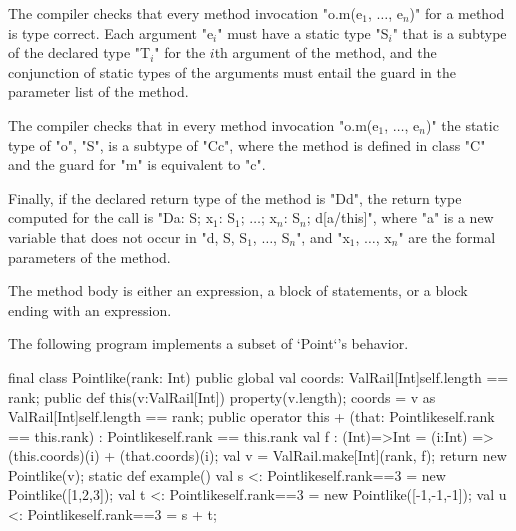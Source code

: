 \begin{staticrule*}
    The compiler checks that every method invocation
    \xcdmath"o.m(e$_1$, $\dots$, e$_n$)"
    for a method is type correct. Each argument
    \xcdmath"e$_i$" must have a
    static type \xcdmath"S$_i$" that is a subtype of the declared type
    \xcdmath"T$_i$" for the $i$th
    argument of the method, and the conjunction of static types
    of the arguments must entail the guard in the parameter list
    of the method.

    The compiler checks that in every method invocation
    \xcdmath"o.m(e$_1$, $\dots$, e$_n$)"
    the static type of \xcd"o", \xcd"S", is a subtype of \xcd"C{c}", where the method
    is defined in class \xcd"C" and the guard for \xcd"m" is equivalent to
    \xcd"c".

    Finally, if the declared return type of the method is
    \xcd"D{d}", the
    return type computed for the call is
    \xcdmath"D{a: S; x$_1$: S$_1$; $\dots$; x$_n$: S$_n$; d[a/this]}",
    where \xcd"a" is a new
    variable that does not occur in
    \xcdmath"d, S, S$_1$, $\dots$, S$_n$", and
    \xcdmath"x$_1$, $\dots$, x$_n$" are the formal
    parameters of the method.
\end{staticrule*}
The method body is either an expression, a block of statements,
or a block ending with an expression.

\begin{example}
The following program implements a subset of \xcd`Point`'s behavior.  

\begin{xten}
final class Pointlike(rank: Int)  {
    public global val coords: ValRail[Int]{self.length == rank};
    public def this(v:ValRail[Int]) {
       property(v.length);
       coords = v as ValRail[Int]{self.length == rank};
    }
    public operator this + (that: Pointlike{self.rank == this.rank})
       : Pointlike{self.rank == this.rank}
       {
         val f : (Int)=>Int = (i:Int) => 
                 (this.coords)(i) + (that.coords)(i);
         val v = ValRail.make[Int](rank, f);
         return new Pointlike(v);
       }
    static def example() {
       val s <: Pointlike{self.rank==3} = new Pointlike([1,2,3]);
       val t <: Pointlike{self.rank==3} = new Pointlike([-1,-1,-1]);
       val u <: Pointlike{self.rank==3} = s + t;
    }
}
\end{xten}
%
\end{example}

